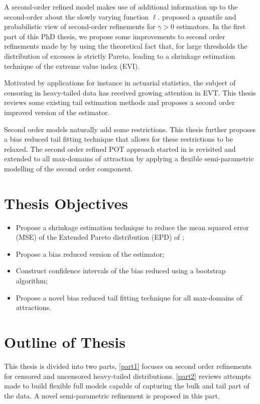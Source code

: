 A second-order refined model makes use of additional information up to the second-order about the slowly varying function $\ell$. \cite{sts626} proposed a quantile and probabilistic view of second-order refinements for $\gamma>0$ estimators. In the first part of this PhD thesis, we propose some improvements to second order refinements made by \cite{beirlant2009second} by using the theoretical fact that, for large thresholds the distribution of excesses is strictly Pareto, leading to a shrinkage estimation technique of the extreme value index (EVI).

Motivated by applications for instance in actuarial statistics, the subject of censoring in heavy-tailed data has received growing attention in EVT. This thesis reviews some existing tail estimation methods and proposes a second order improved version of the \cite{worms2014new} estimator.

Second order models naturally add some restrictions. This thesis further proposes a bias reduced tail fitting technique that allows for these restrictions to be relaxed. The second order refined POT approach started in \cite{beirlant2009second} is revisited and extended to all max-domains of attraction by applying a flexible semi-parametric modelling of the second order component.

\section{Thesis Objectives}
\begin{itemize}
    \item Propose a shrinkage estimation technique to reduce the mean squared error (MSE) of the Extended Pareto distribution (EPD) of \cite{beirlant2009second};
    \item Propose a bias reduced version of the \cite{worms2014new} estimator;
    \item Construct confidence intervals of the bias reduced \cite{worms2014new} using a bootstrap algorithm;
    \item Propose a novel bias reduced tail fitting technique for all max-domains of attractions.
\end{itemize}
\section{Outline of Thesis}
This thesis is divided into two parts, \autoref{part1} focuses on second order refinements for censored and uncensored heavy-tailed distributions. \autoref{part2} reviews attempts made to build flexible full models capable of capturing the bulk and tail part of the data. A novel semi-parametric refinement is proposed in this part.

